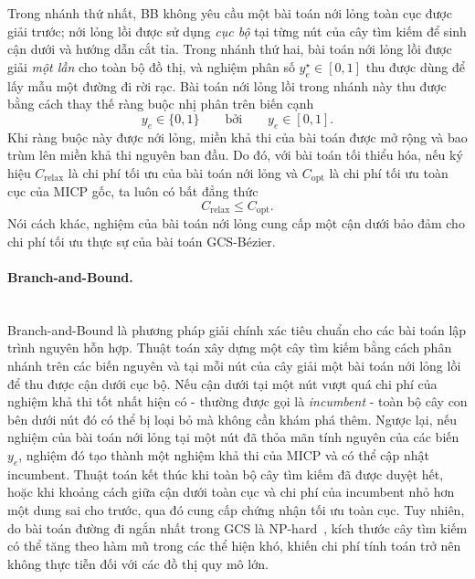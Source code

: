 Trong nhánh thứ nhất, BB không yêu cầu một bài toán nới lỏng toàn cục được giải trước; nới lỏng lồi được sử dụng \emph{cục bộ} tại từng nút của cây tìm kiếm để sinh cận dưới và hướng dẫn cắt tỉa.
Trong nhánh thứ hai, bài toán nới lỏng lồi được giải \emph{một lần} cho toàn bộ đồ thị, và nghiệm phân số $y_e^\star \in [0,1]$ thu được dùng để lấy mẫu một đường đi rời rạc.
Bài toán nới lỏng lồi trong nhánh này thu được bằng cách thay thế ràng buộc nhị phân trên biến cạnh
\[
    y_e \in \{0,1\}
    \qquad \text{bởi} \qquad
    y_e \in [0,1].
\]
Khi ràng buộc này được nới lỏng, miền khả thi của bài toán được mở rộng và bao trùm lên miền khả thi nguyên ban đầu.
Do đó, với bài toán tối thiểu hóa, nếu ký hiệu $C_{\mathrm{relax}}$ là chi phí tối ưu của bài toán nới lỏng và $C_{\mathrm{opt}}$ là chi phí tối ưu toàn cục của MICP gốc, ta luôn có bất đẳng thức
\begin{equation}
    C_{\mathrm{relax}} \le C_{\mathrm{opt}}.
    \label{eq:gcs_relax_lower_bound}
\end{equation}
Nói cách khác, nghiệm của bài toán nới lỏng cung cấp một cận dưới bảo đảm cho chi phí tối ưu thực sự của bài toán GCS-Bézier.

\paragraph{Branch-and-Bound.}\mbox{}\\

Branch-and-Bound là phương pháp giải chính xác tiêu chuẩn cho các bài toán lập trình nguyên hỗn hợp.
Thuật toán xây dựng một cây tìm kiếm bằng cách phân nhánh trên các biến nguyên và tại mỗi nút của cây giải một bài toán nới lỏng lồi để thu được cận dưới cục bộ.
Nếu cận dưới tại một nút vượt quá chi phí của nghiệm khả thi tốt nhất hiện có - thường được gọi là \emph{incumbent} - toàn bộ cây con bên dưới nút đó có thể bị loại bỏ mà không cần khám phá thêm.
Ngược lại, nếu nghiệm của bài toán nới lỏng tại một nút đã thỏa mãn tính nguyên của các biến $y_e$, nghiệm đó tạo thành một nghiệm khả thi của MICP và có thể cập nhật incumbent.
Thuật toán kết thúc khi toàn bộ cây tìm kiếm đã được duyệt hết, hoặc khi khoảng cách giữa cận dưới toàn cục và chi phí của incumbent nhỏ hơn một dung sai cho trước, qua đó cung cấp chứng nhận tối ưu toàn cục.
Tuy nhiên, do bài toán đường đi ngắn nhất trong GCS là NP-hard~\cite{MarcucciEtAl2023GCS,Marcucci2024Thesis}, kích thước cây tìm kiếm có thể tăng theo hàm mũ trong các thể hiện khó, khiến chi phí tính toán trở nên không thực tiễn đối với các đồ thị quy mô lớn.

